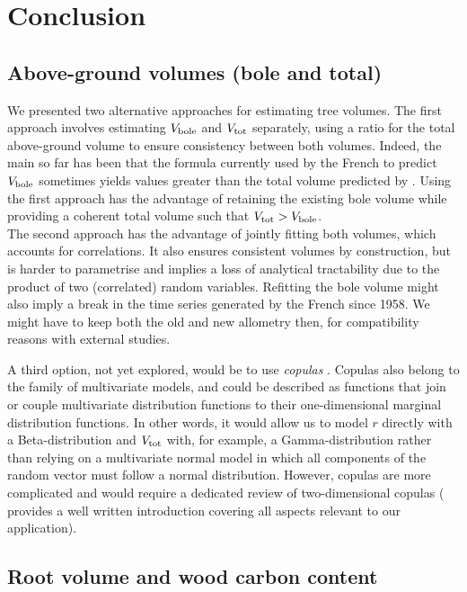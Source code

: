 \chapter{Conclusion\label{chap::conclusion}}

\section{Above-ground volumes (bole and total)}
We presented two alternative approaches for estimating tree volumes. The first approach involves estimating \( V_{\text{bole}} \) and \( V_{\text{tot}} \) separately, using a ratio for the total above-ground volume to ensure consistency between both volumes. Indeed, the main so far has been that the formula currently used by the French \NFI{} to predict \( V_{\text{bole}} \) \parencite{Morneau2016} sometimes yields values greater than the total volume predicted by \cite{Vallet2006}. Using the first approach has the advantage of retaining the existing \NFI{} bole volume while providing a coherent total volume such that \( V_{\text{tot}} > V_{\text{bole}} \). \\

The second approach has the advantage of jointly fitting both volumes, which accounts for correlations. It also ensures consistent volumes by construction, but is harder to parametrise and implies a loss of analytical tractability due to the product of two (correlated) random variables. Refitting the bole volume might also imply a break in the time series generated by the French \NFI since 1958. We might have to keep both the old and new allometry then, for compatibility reasons with external studies.

A third option, not yet explored, would be to use \textit{copulas} \parencite{Nelsen2006}. Copulas also belong to the family of multivariate models, and could be described as functions that join or couple multivariate distribution functions to their one-dimensional marginal distribution functions. In other words, it would allow us to model \( r \) directly with a Beta-distribution and \( V_{\text{tot}} \) with, for example, a Gamma-distribution rather than relying on a multivariate normal model in which all components of the random vector must follow a normal distribution. However, copulas are more complicated and would require a dedicated review of two-dimensional copulas (\textcite{Nelsen2006} provides a well written introduction covering all aspects relevant to our application).

\section{Root volume and wood carbon content}


